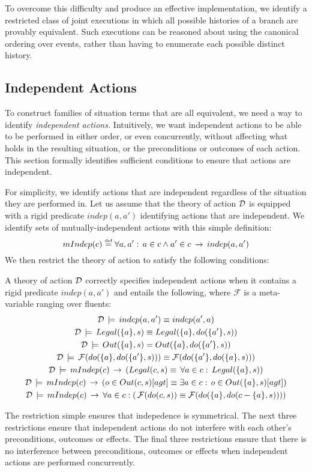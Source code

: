 To overcome this difficulty and produce an effective implementation,
we identify a restricted class of joint executions in which all possible
histories of a branch are provably equivalent. Such executions can
be reasoned about using the canonical ordering over events, rather
than having to enumerate each possible distinct history.


\subsection{Independent Actions}

To construct families of situation terms that are all equivalent,
we need a way to identify \emph{independent actions.} Intuitively,
we want independent actions to be able to be performed in either order,
or even concurrently, without affecting what holds in the resulting
situation, or the preconditions or outcomes of each action. This section
formally identifies sufficient conditions to ensure that actions are
independent.

For simplicity, we identify actions that are independent regardless
of the situation they are performed in. Let us assume that the theory
of action $\mathcal{D}$ is equipped with a rigid predicate $indep(a,a')$
identifying actions that are independent. We identify sets of mutually-independent
actions with this simple definition:\[
mIndep(c)\stackrel{\mbox{\tiny def}}{=}\forall a,a':\, a\in c\wedge a'\in c\,\rightarrow\, indep(a,a')\]
 We then restrict the theory of action to satisfy the following conditions:

\begin{defnL}
 A theory of action $\mathcal{D}$ correctly
specifies independent actions when it contains a rigid predicate $indep(a,a')$
and entails the following, where $\mathcal{F}$ is a meta-variable
ranging over fluents:\begin{gather*}
\mathcal{D}\,\models\, indep(a,a')\equiv indep(a',a)\\
\mathcal{D}\,\models\, Legal(\{a\},s)\equiv Legal(\{a\},do(\{a'\},s))\\
\mathcal{D}\,\models\, Out(\{a\},s)=Out(\{a\},do(\{a'\},s))\\
\mathcal{D}\,\models\,\mathcal{F}(do(\{a\},do(\{a'\},s)))\equiv\mathcal{F}(do(\{a'\},do(\{a\},s)))\\
\mathcal{D}\,\models\, mIndep(c)\,\rightarrow\,\left(Legal(c,s)\equiv\,\forall a\in c:\, Legal(\{a\},s)\right)\\
\mathcal{D}\,\models\, mIndep(c)\,\rightarrow\,\left(o\in Out(c,s)[agt]\equiv\exists a\in c:\, o\in Out(\{a\},s)[agt]\right)\\
\mathcal{D}\,\models\, mIndep(c)\,\rightarrow\,\forall a\in c:\left(\,\mathcal{F}(do(c,s))\equiv\mathcal{F}(do(\{a\},do(c-\{a\},s)))\right)\end{gather*}

\end{defnL}
The restriction simple ensures that indepedence is symmetrical. The
next three restrictions ensure that independent actions do not interfere
with each other's preconditions, outcomes or effects. The final three
restrictions ensure that there is no interference between preconditions,
outcomes or effects when independent actions are performed concurrently.



